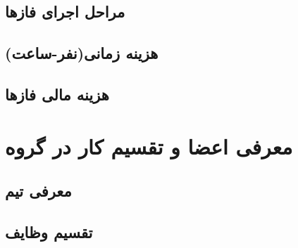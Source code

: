 \documentclass{article}
\begin{document}
\subsection{مراحل اجرای فازها}
\subsection{هزینه زمانی(نفر-ساعت)}
\subsection{هزینه مالی فازها}
\section{معرفی اعضا و تقسیم کار در گروه}
\subsection{معرفی تیم}
\subsection{تقسیم وظایف}
\end{document}
